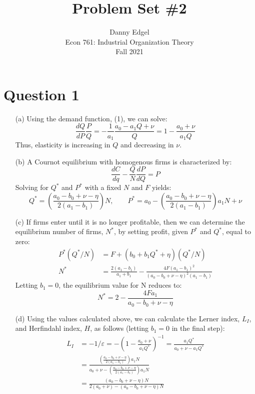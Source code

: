 \documentclass{article}
\begin{document}
\title{	Problem Set \#2 }
\author{ 	Danny Edgel 					        	      \\ 
			Econ 761: Industrial Organization Theory	\\
			Fall 2021						                      \\
		}
\maketitle\thispagestyle{empty}



\section*{Question 1}
\begin{itemize}
    \item[(a)] Using the demand function, (1), we can solve: \[
    \frac{dQ}{dP}\frac{P}{Q} = -\frac{1}{a_1}\frac{a_0 - a_1Q + \nu}{Q} = 1 - \frac{a_0 + \nu}{a_1Q}
    \] 
    Thus, elasticity is increasing in $Q$ and decreasing in $\nu$.
    \item[(b)] A Cournot equilibrium with homogenous firms is characterized by:\[
      \frac{dC}{dq} - \frac{Q}{N}\frac{dP}{dQ} = P
    \]
    Solving for $Q^*$ and $P^*$ with a fixed $N$ and $F$ yields:\[
      Q^* = \left(\frac{a_0-b_0+\nu-\eta}{2(a_1-b_1)}\right)N,\quad\quad 
      P^* = a_0 - \left(\frac{a_0-b_0+\nu-\eta}{2(a_1-b_1)}\right)a_1N + \nu
    \]
    \item[(c)] If firms enter until it is no longer profitable, then we can determine the equilibrium number of firms, $N^*$, by setting profit, given $P^*$ and $Q^*$, equal to zero: \begin{align*} 
      P^*(Q^*/N) &= F  + (b_0 + b_1Q^* + \eta)(Q^*/N) \\
      N^* &= \frac{2(a_1-b_1)}{a_1 + b_1} - \frac{4F(a_1-b_1)^2}{(a_0-b_0+\nu-\eta)^2(a_1-b_1)}
    \end{align*}
    Letting $b_1=0$, the equilibrium value for N reduces to:\[
      N^* = 2-\frac{4Fa_1}{a_0-b_0+\nu-\eta}
    \]
    \item[(d)] Using the values calculated above, we can calculate the Lerner index, $L_I$, and Herfindahl index, $H$, as follows (letting ${b_1=0}$ in the final step): \begin{align*}
      L_I &=  -1/\varepsilon = -\left(1 - \frac{a_0 + \nu}{a_1Q^*}\right)^{-1} = \frac{a_1Q^*}{a_0 + \nu - a_1Q^*} \\ &= \frac{\left(\frac{a_0 -b_0 + \nu - \eta}{2(a_1-b_1)}\right)a_1N}{a_0 + \nu - \left(\frac{a_0 -b_0 + \nu - \eta}{2(a_1-b_1)}\right)a_1N} \\ &= \frac{(a_0-b_0+\nu-\eta)N}{2(a_0+\nu)-(a_0-b_0+\nu-\eta)N} \\

\end{align*}
\end{itemize}
\end{document}

